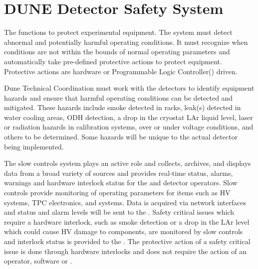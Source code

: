 \section{DUNE Detector Safety System}
\label{sec:fdsp-coord-det-safety}


The  functions to
protect experimental equipment.  The system must detect abnormal and
potentially harmful operating conditions.  It must recognize when
conditions are not within the bounds of normal operating parameters
and automatically take pre-defined protective actions to protect
equipment.  Protective actions are hardware or Programmable Logic
Controller() driven.

Dune Technical Coordination must work with the detectors to identify
equipment hazards and ensure that harmful operating conditions can be
detected and mitigated.  These hazards include smoke detected in
racks, leak(s) detected in water cooling areas, ODH detection, a drop
in the cryostat LAr liquid level, laser or radiation hazards in
calibration systems, over or under voltage conditions, and others to
be determined.  Some hazards will be unique to the actual detector
being implemented.

The slow controls system plays an active role and collects, archives,
and displays data from a broad variety of sources and provides
real-time status, alarms, warnings and hardware interlock status for
the  and detector operators. Slow controls provide monitoring
of operating parameters for items such as HV systems, TPC electronics,
and  systems. Data is acquired via network interfaces and status and
alarm levels will be sent to the .  Safety critical issues which
require a hardware interlock, such as smoke detection or a drop in the
LAr level which could cause HV damage to components, are monitored by
slow controls and interlock status is provided to the .  The
protective action of a safety critical issue is done through hardware
interlocks and does not require the action of an operator, software or
.

